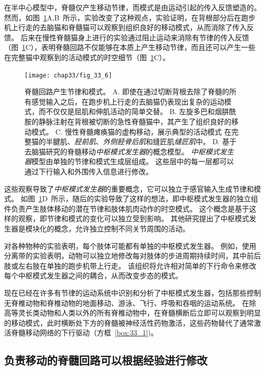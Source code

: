 在半中心模型中，脊髓仅产生移动节律，而模式是由运动引起的传入反馈塑造的。
然而，如图~\ref{fig:33_6}A,B~所示，实验改变了这种观点，实验证明，在背根部分后在跑步机上行走的去脑猫和脊髓猫可以观察到组织良好的移动模式，从而消除了传入反馈。
后来在慢性脊髓猫身上进行的实验通过阻止运动来消除有节律的传入反馈（图~\ref{fig:33_6}C），表明脊髓回路不仅能够在本质上产生移动节律，而且还可以产生一些在完整猫中观察到的活动模式的时空细节（图~\ref{fig:33_6}C）。


\begin{figure}[htbp]
	\centering
	\texttt{[image: chap33/fig\_33\_6]}
	\caption{脊髓回路产生节律和模式。
	A. 即使在通过切断背根去除了脊髓的所有感觉输入之后，在跑步机上行走的去脑猫仍表现出复杂的运动模式，而不仅仅是屈肌和伸肌活动的简单交替\cite{grillner1984effect}。
	B. 左旋多巴和烟肼酰胺的静脉注射在背根被切断的急性脊髓猫中，其产生了组织良好的移动模式\cite{grillner1979central}。
	C. 慢性脊髓瘫痪猫的虚构移动，展示典型的活动模式 在完整猫的半腱肌、\textit{胫前肌}、\textit{外侧胫骨后肌}和缝匠肌\textit{缝匠肌}中\cite{pearson1991fictive}。
	D. 基于去脑猫研究的脊髓移动\textit{中枢模式发生器}的概念模型。
	\textit{中枢模式发生器}模型由单独的节律和模式生成层组成。
	这些层中的每一层都可以通过下行输入和外围传入信息进行修改\cite{rybak2006modelling}。}
	\label{fig:33_6}
\end{figure}


这些观察导致了\textit{中枢模式发生器}的重要概念，它可以独立于感官输入生成节律和模式。
如图~\ref{fig:33_6}D~所示，随后的实验导致了这样的想法，即中枢模式发生器的独立组件负责产生肢体移动的潜在节律和肢体肌肉动作的时空模式。
这个概念是基于这样的观察，即节律和模式的变化可以独立受到影响。
其他研究提出了中枢模式发生器是模块化的概念，允许独立控制不同关节周围的活动。


对各种物种的实验表明，每个肢体可能都有单独的中枢模式发生器。
例如，使用分离带的实验表明，动物可以独立地修改每对肢体的步进周期持续时间，其中前后肢或左右肢在单独的跑步机带上行走。
该组织将允许相对简单的下行命令来修改每个中枢模式发生器之间的耦合，从而改变步态的模式。


现在已经在许多有节律的运动系统中识别和分析了中枢模式发生器，包括那些控制无脊椎动物和脊椎动物的地面移动、游泳、飞行、呼吸和吞咽的运动系统。
在除高等灵长类动物和人类以外的所有脊椎动物中，在脊髓横断后立即可以观察到明显的移动模式，此时横断处下方的脊髓被神经活性药物激活，这些药物替代了通常激活脊髓移动网络的下行驱动（方框~\ref{box:33_1})。



\subsection{负责移动的脊髓回路可以根据经验进行修改}

